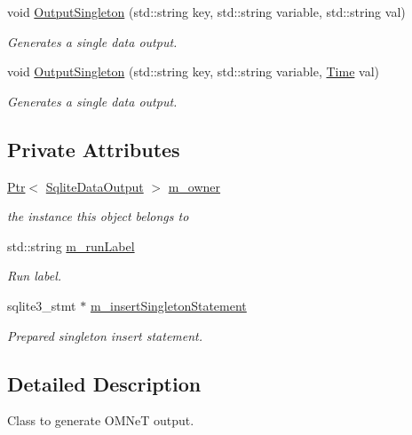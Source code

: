 \begin{DoxyCompactItemize}
void \hyperlink{classns3_1_1SqliteDataOutput_1_1SqliteOutputCallback_a0128cb037f9ad8b6d8143163c137eaf1}{Output\+Singleton} (std\+::string key, std\+::string variable, std\+::string val)
\begin{DoxyCompactList}\small\item\em Generates a single data output. \end{DoxyCompactList}\item 
void \hyperlink{classns3_1_1SqliteDataOutput_1_1SqliteOutputCallback_a373cce8d5f70b3a021ee0c61d869d927}{Output\+Singleton} (std\+::string key, std\+::string variable, \hyperlink{classns3_1_1Time}{Time} val)
\begin{DoxyCompactList}\small\item\em Generates a single data output. \end{DoxyCompactList}\end{DoxyCompactItemize}
\subsection*{Private Attributes}
\begin{DoxyCompactItemize}
\item 
\hyperlink{classns3_1_1Ptr}{Ptr}$<$ \hyperlink{classns3_1_1SqliteDataOutput}{Sqlite\+Data\+Output} $>$ \hyperlink{classns3_1_1SqliteDataOutput_1_1SqliteOutputCallback_a89843fd0048254a4b33276f7f6522c1a}{m\+\_\+owner}
\begin{DoxyCompactList}\small\item\em the instance this object belongs to \end{DoxyCompactList}\item 
std\+::string \hyperlink{classns3_1_1SqliteDataOutput_1_1SqliteOutputCallback_a95697997747ea145f2c3d07f9126afd9}{m\+\_\+run\+Label}
\begin{DoxyCompactList}\small\item\em Run label. \end{DoxyCompactList}\item 
sqlite3\+\_\+stmt $\ast$ \hyperlink{classns3_1_1SqliteDataOutput_1_1SqliteOutputCallback_a4494ed1863eba3aa3a808456a8920e0f}{m\+\_\+insert\+Singleton\+Statement}
\begin{DoxyCompactList}\small\item\em Prepared singleton insert statement. \end{DoxyCompactList}\end{DoxyCompactItemize}


\subsection{Detailed Description}
Class to generate O\+M\+NeT output. 

